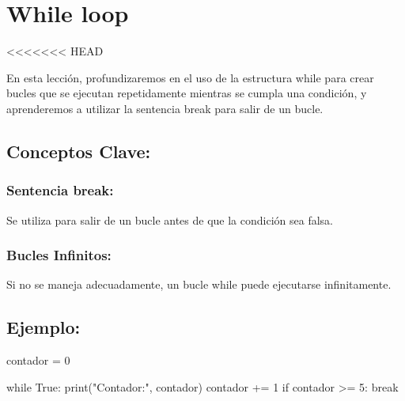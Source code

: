 \documentclass[
  a4paper,
  onepage,
  openany]{scrreprt}
\newenvironment{Shaded}{\begin{snugshade}}{\end{snugshade}}
\newcommand{\BuiltInTok}[1]{\textcolor[rgb]{0.00,0.23,0.31}{#1}}
\newcommand{\ControlFlowTok}[1]{\textcolor[rgb]{0.00,0.23,0.31}{#1}}
\newcommand{\DecValTok}[1]{\textcolor[rgb]{0.68,0.00,0.00}{#1}}
\newcommand{\NormalTok}[1]{\textcolor[rgb]{0.00,0.23,0.31}{#1}}
\newcommand{\OperatorTok}[1]{\textcolor[rgb]{0.37,0.37,0.37}{#1}}
\newcommand{\StringTok}[1]{\textcolor[rgb]{0.13,0.47,0.30}{#1}}
\newcommand{\VariableTok}[1]{\textcolor[rgb]{0.07,0.07,0.07}{#1}}
\begin{document}
\hypertarget{while-loop}{%
\chapter{While loop}\label{while-loop}}

\textless\textless\textless\textless\textless\textless\textless{} HEAD

En esta lección, profundizaremos en el uso de la estructura while para
crear bucles que se ejecutan repetidamente mientras se cumpla una
condición, y aprenderemos a utilizar la sentencia break para salir de un
bucle.

\hypertarget{conceptos-clave-38}{%
\section{Conceptos Clave:}\label{conceptos-clave-38}}

\hypertarget{sentencia-break}{%
\subsection{Sentencia break:}\label{sentencia-break}}

Se utiliza para salir de un bucle antes de que la condición sea falsa.

\hypertarget{bucles-infinitos}{%
\subsection{Bucles Infinitos:}\label{bucles-infinitos}}

Si no se maneja adecuadamente, un bucle while puede ejecutarse
infinitamente.

\hypertarget{ejemplo-38}{%
\section{Ejemplo:}\label{ejemplo-38}}

\begin{Shaded}
\begin{Highlighting}[]
\NormalTok{contador }\OperatorTok{=} \DecValTok{0}

\ControlFlowTok{while} \VariableTok{True}\NormalTok{:}
    \BuiltInTok{print}\NormalTok{(}\StringTok{"Contador:"}\NormalTok{, contador)}
\NormalTok{    contador }\OperatorTok{+=} \DecValTok{1}
    \ControlFlowTok{if}\NormalTok{ contador }\OperatorTok{\textgreater{}=} \DecValTok{5}\NormalTok{:}
        \ControlFlowTok{break}
\end{Highlighting}
\end{Shaded}
\end{document}
